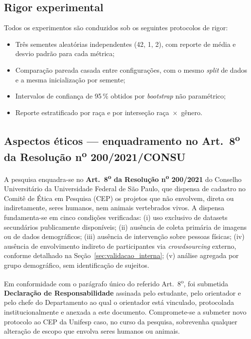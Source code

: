 \subsection{Rigor experimental}
\label{sec:rigor}

Todos os experimentos são conduzidos sob os seguintes protocolos de rigor:

\begin{itemize}
\item Três sementes aleatórias independentes (42, 1, 2), com reporte de média e desvio padrão para cada métrica;
\item Comparação pareada casada entre configurações, com o mesmo \emph{split} de dados e a mesma inicialização por semente;
\item Intervalos de confiança de 95\,\% obtidos por \emph{bootstrap} não paramétrico;
\item Reporte estratificado por raça e por interseção raça~$\times$~gênero.
\end{itemize}

\subsection{Aspectos éticos --- enquadramento no Art.~8\textsuperscript{o} da Resolução n\textsuperscript{o} 200/2021/CONSU}
\label{sec:etica}

A pesquisa enquadra-se no \textbf{Art.~8\textsuperscript{o} da Resolução n\textsuperscript{o} 200/2021} do Conselho Universitário da Universidade Federal de São Paulo, que dispensa de cadastro no Comitê de Ética em Pesquisa (CEP) os projetos que não envolvem, direta ou indiretamente, seres humanos, nem animais vertebrados vivos. A dispensa fundamenta-se em cinco condições verificadas: (i) uso exclusivo de datasets secundários publicamente disponíveis; (ii) ausência de coleta primária de imagens ou de dados demográficos; (iii) ausência de intervenção sobre pessoas físicas; (iv) ausência de envolvimento indireto de participantes via \emph{crowdsourcing} externo, conforme detalhado na Seção~\ref{sec:validacao_interna}; (v) análise agregada por grupo demográfico, sem identificação de sujeitos.

Em conformidade com o parágrafo único do referido Art.~8\textsuperscript{o}, foi submetida \textbf{Declaração de Responsabilidade} assinada pelo estudante, pelo orientador e pelo chefe do Departamento ao qual o orientador está vinculado, protocolada institucionalmente e anexada a este documento. Compromete-se a submeter novo protocolo ao CEP da Unifesp caso, no curso da pesquisa, sobrevenha qualquer alteração de escopo que envolva seres humanos ou animais.
